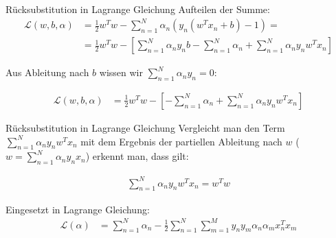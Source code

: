 \documentclass[ngerman]{beamer}
\newcommand{\Lagr}{\mathcal{L}}
\begin{document}
\begin{frame}{Rücksubstitution in Lagrange Gleichung}
Aufteilen der Summe:
\begin{equation*}
	\begin{aligned}
		\Lagr(w, b, \alpha) &= \frac{1}{2} w^{T} w - \sum_{n=1}^{N} \alpha_{n} (y_n (w^{T} x_{n} + b)-1) = \\
		&= \frac{1}{2} w^{T} w - [\sum_{n=1}^{N} \alpha_{n} y_{n} b - \sum_{n=1}^{N} \alpha_{n} + \sum_{n=1}^{N} \alpha_{n} y_{n} w^{T} x_{n}]
	\end{aligned}
\end{equation*}

Aus Ableitung nach $b$ wissen wir $\sum_{n=1}^{N} \alpha_{n} y_{n} = 0$:

\begin{equation*}
	\begin{aligned}
		\Lagr(w, b, \alpha) &= \frac{1}{2} w^{T} w - [-\sum_{n=1}^{N} \alpha_{n} + \sum_{n=1}^{N} \alpha_{n} y_{n} w^{T} x_{n}]
	\end{aligned}
\end{equation*}

\end{frame}


\begin{frame}{Rücksubstitution in Lagrange Gleichung}
Vergleicht man den Term $\sum_{n=1}^{N} \alpha_{n} y_{n} w^{T} x_{n}$ mit dem Ergebnis der partiellen Ableitung nach $w$ ($w = \sum_{n=1}^{N} \alpha_{n} y_{n} x_{n}$) erkennt man, dass gilt:

\begin{equation*}
	\begin{aligned}
		\sum_{n=1}^{N} \alpha_{n} y_{n} w^{T} x_{n} = w^T w
	\end{aligned}
\end{equation*}

Eingesetzt in Lagrange Gleichung:
\begin{equation*}
	\begin{aligned}
		\Lagr(\alpha) &= \sum_{n=1}^{N }\alpha_{n} - \frac{1}{2} \sum_{n=1}^{N} \sum_{m=1}^{M} y_{n} y_{m} \alpha_{n} \alpha_{m} x_{n}^{T} x_{m}
	\end{aligned}
\end{equation*}

\end{frame}
\end{document}
